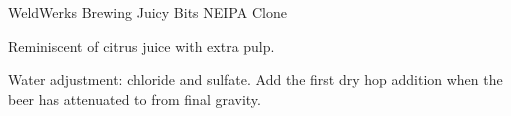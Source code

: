\begin{recipe}{WeldWerks Brewing Juicy Bits NEIPA Clone}

\begin{aboutblock}
Reminiscent of citrus juice with extra pulp. 
\end{aboutblock}


\begin{methodandtiming}
 
\begin{mashsteps}
\end{mashsteps}

\begin{fermentationsteps}
\end{fermentationsteps}

\begin{directions}
Water adjustment:  chloride and  sulfate. Add the
first dry hop addition when the beer has attenuated to  from final
gravity.
\end{directions}

\end{methodandtiming}

\recipebreak

\begin{ingredientsblock}

\begin{malts}
\end{malts}

\begin{hops}
\end{hops}


\end{ingredientsblock}
\end{recipe}

